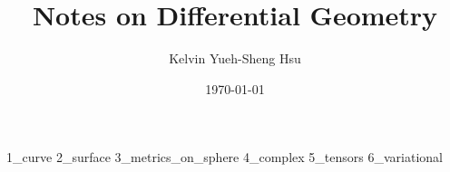 \documentclass[12pt]{article}
\title{\textbf{Notes on Differential Geometry}}  %
\author{Kelvin Yueh-Sheng Hsu}      %
\date{\today}      %
\begin{document}
\maketitle                   %

{1_curve}
{2_surface}
{3_metrics_on_sphere}
{4_complex}
{5_tensors}
{6_variational}
\end{document}

